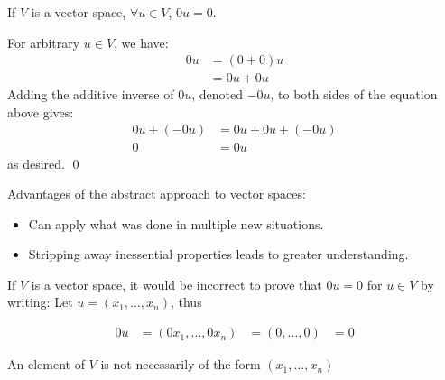 \begin{theorem}
    If $V$ is a vector space, $\forall u \in V$, $0u = 0$.
    \begin{proof*}
    For arbitrary $u \in V$, we have:
    \begin{align*}
        0u &= (0 + 0)u \\
        &= 0u + 0u
    \end{align*}
    Adding the additive inverse of $0u$, denoted $-0u$, to both sides of the equation
    above gives:
    \begin{align*}
        0u + (-0u) &= 0u + 0u + (-0u) \\
        0 &= 0u
    \end{align*}
    as desired. \qed
    \end{proof*}

\end{theorem}

Advantages of the abstract approach to vector spaces:
\begin{itemize}
    \item Can apply what was done in multiple new situations.
    \item Stripping away inessential properties leads to greater understanding.
\end{itemize}

If $V$ is a vector space, it would be incorrect to prove that $0u = 0$ for $u \in V$
by writing: Let $u = (x_1, \ldots, x_n)$, thus

\begin{align*}
    0u &= (0x_1, \ldots, 0x_n)
    &= (0, \ldots, 0)
    &= 0
\end{align*}

\begin{note}
    An element of $V$ is not necessarily of the form $(x_1, \ldots, x_n)$
\end{note}

\endinput